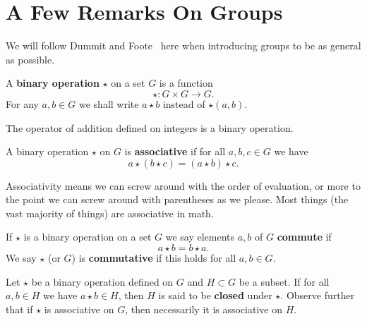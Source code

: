\section{A Few Remarks On Groups}

We will follow Dummit and Foote~\cite{dummitFoote} here when introducing groups
to be as general as possible. 

\begin{defn}
A \textbf{binary operation} $\star$ on a set $G$ is a function
\begin{equation}
\star: G\times G\to G.
\end{equation}
For any $a,b\in G$ we shall write $a\star b$ instead of $\star(a,b)$.
\end{defn}

\begin{ex}
The operator of addition defined on integers is a binary operation.
\end{ex}

\begin{defn}
A binary operation $\star$ on $G$ is \textbf{associative} if for all $a,b,c\in G$
we have 
\begin{equation}
a\star(b\star c)=(a\star b)\star c.
\end{equation}
\end{defn}
\begin{rmk}
Associativity means we can screw around with the order of evaluation, or more to
the point we can screw around with parentheses as we please. Most things (the
vast majority of things) are associative in math.
\end{rmk}

\begin{defn}
If $\star$ is a binary operation on a set $G$ we say elements $a,b$ of $G$
\textbf{commute} if
\begin{equation}
a\star b = b\star a.
\end{equation}
We say $\star$ (or $G$) is \textbf{commutative} if this holds for all $a,b\in G$.
\end{defn}

\begin{rmk}
Let $\star$ be a binary operation defined on $G$ and $H\subset G$ be a subset.
If for all $a,b\in H$ we have $a\star b\in H$, then $H$ is said to be \textbf{closed}
under $\star$. Observe further that if $\star$ is associative on $G$, then
necessarily it is associative on $H$.
\end{rmk}

